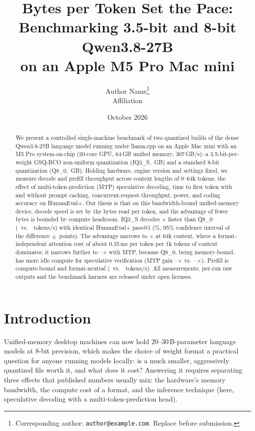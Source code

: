 \documentclass[11pt]{article}
\title{Bytes per Token Set the Pace:\\ Benchmarking 3.5-bit and 8-bit Qwen3.8-27B\\ on an Apple M5 Pro Mac mini}
\author{%
  Author Name\thanks{Corresponding author: \texttt{author@example.com}. Replace before submission.}\\
  Affiliation
}
\date{October 2026}
\begin{document}
\maketitle

\begin{abstract}
We present a controlled single-machine benchmark of two quantized builds of the dense
Qwen3.8-27B language model running under llama.cpp on an Apple Mac mini with an M5 Pro
system-on-chip (20-core GPU, 64\,GB unified memory, 307\,GB/s): a 3.5-bit-per-weight
GSQ-RCO non-uniform quantization (IQ3\_S, \IQsizeGB\,GB) and a standard 8-bit quantization
(Q8\_0, \QEsizeGB\,GB). Holding hardware, engine version and settings fixed, we measure
decode and prefill throughput across context lengths of 0--64k tokens, the effect of
multi-token-prediction (MTP) speculative decoding, time to first token with and without
prompt caching, concurrent-request throughput, power, and coding accuracy on HumanEval+.
Our thesis is that on this bandwidth-bound unified-memory device, decode speed is set by
the bytes read per token, and the advantage of fewer bytes is bounded by compute headroom.
IQ3\_S decodes \tgRatioZero$\times$ faster than Q8\_0 (\IQtgZero\ vs.\ \QEtgZero\ tokens/s)
with identical HumanEval+ pass@1 (\IQhePlus\%, 95\% confidence interval of the difference
$\pm$\hePlusDiffHalfCI\ points). The advantage narrows to \tgRatioLong$\times$ at 64k
context, where a format-independent attention cost of about 0.35\,ms per token per 1k
tokens of context dominates; it narrows further to \mtpRatioMin--\mtpRatioMax$\times$ with
MTP, because Q8\_0, being memory-bound, has more idle compute for speculative verification
(MTP gain \QEmtpMin--\QEmtpMax$\times$ vs.\ \IQmtpMin--\IQmtpMax$\times$). Prefill is
compute-bound and format-neutral (\IQppZero\ vs.\ \QEppZero\ tokens/s). All measurements,
per-run raw outputs and the benchmark harness are released under open licenses.
\end{abstract}

\section{Introduction}

Unified-memory desktop machines can now hold 20--30\,B-parameter language models at 8-bit
precision, which makes the choice of weight format a practical question for anyone running
models locally: is a much smaller, aggressively quantized file worth it, and what does it
cost? Answering it requires separating three effects that published numbers usually mix:
the hardware's memory bandwidth, the compute cost of a format, and the inference
technique (here, speculative decoding with a multi-token-prediction head).
\end{document}
